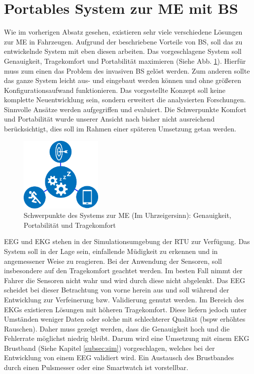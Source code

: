 {\section{Portables System zur \acl{ME} mit \acl{BS}}
\label{chap:prop}
Wie im vorherigen Absatz gesehen, existieren sehr viele verschiedene Lösungen zur \acl{ME} in Fahrzeugen. Aufgrund der beschriebene Vorteile von \acl{BS}, soll das zu entwickelnde System mit eben diesen arbeiten. Das vorgeschlagene System soll Genauigkeit, Tragekomfort und Portabilität maximieren (Siehe Abb. \ref{fig:emphasis}). Hierfür muss zum einen das Problem des invasiven \acl{BS} gelöst werden. Zum anderen sollte das ganze System leicht aus- und eingebaut werden können und ohne größeren Konfigurationsaufwand funktionieren. 
Das vorgestellte Konzept soll keine komplette Neuentwicklung sein, sondern erweitert die analysierten Forschungen. Sinnvolle Ansätze werden aufgegriffen und evaluiert. Die Schwerpunkte Komfort und Portabilität wurde unserer Ansicht nach bisher nicht ausreichend berücksichtigt, dies soll im Rahmen einer späteren Umsetzung getan werden. \\

\begin{figure}[h] 
  \begin{center}
    \includegraphics[width=4cm]{img/all}
    \caption{Schwerpunkte des Systems zur \acl{ME} (Im Uhrzeigersinn): Genauigkeit, Portabilität und Tragekomfort}
    \label{fig:emphasis}
  \end{center}
\end{figure}

EEG und EKG stehen in der Simulationsumgebung der \acl{RTU} zur Verfügung. Das System soll in der Lage sein, einfallende Müdigkeit zu erkennen und in angemessener Weise zu reagieren. Bei der Anwendung der Sensoren, soll insbesondere auf den Tragekomfort geachtet werden. Im besten Fall nimmt der Fahrer die Sensoren nicht wahr und wird durch diese nicht abgelenkt. Das EEG scheidet bei dieser Betrachtung von vorne herein aus und soll während der Entwicklung zur Verfeinerung bzw. Validierung genutzt werden. Im Bereich des EKGs existieren Lösungen mit höheren Tragekomfort. Diese liefern jedoch unter Umständen weniger Daten oder solche mit schlechterer Qualität (\acl{bspw} erhöhtes Rauschen). Daher muss gezeigt werden, dass die Genauigkeit hoch und die Fehlerrate möglichst niedrig bleibt. 
Darum wird eine Umsetzung mit einem EKG Brustband (Siehe Kapitel \ref{subsec:sim}) vorgeschlagen, welches bei der Entwicklung von einem EEG validiert wird. Ein Austausch des Brustbandes durch einen Pulsmesser oder eine Smartwatch ist vorstellbar.\\

}
